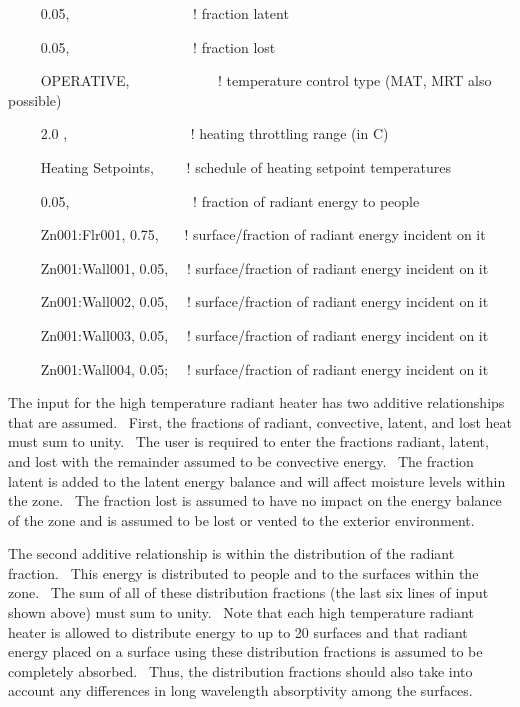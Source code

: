 {~~~~ 0.05,~~~~~~~~~~~~~~~~~ ! fraction latent

~~~~ 0.05,~~~~~~~~~~~~~~~~~ ! fraction lost

~~~~ OPERATIVE,~~~~~~~~~~~~ ! temperature control type (MAT, MRT also possible)

~~~~ 2.0 ,~~~~~~~~~~~~~~~~~ ! heating throttling range (in C)

~~~~ Heating Setpoints,~~~~ ! schedule of heating setpoint temperatures

~~~~ 0.05,~~~~~~~~~~~~~~~~~ ! fraction of radiant energy to people

~~~~ Zn001:Flr001, 0.75,~~~ ! surface/fraction of radiant energy incident on it

~~~~ Zn001:Wall001, 0.05,~~ ! surface/fraction of radiant energy incident on it

~~~~ Zn001:Wall002, 0.05,~~ ! surface/fraction of radiant energy incident on it

~~~~ Zn001:Wall003, 0.05,~~ ! surface/fraction of radiant energy incident on it

~~~~ Zn001:Wall004, 0.05;~~ ! surface/fraction of radiant energy incident on it

The input for the high temperature radiant heater has two additive relationships that are assumed.~ First, the fractions of radiant, convective, latent, and lost heat must sum to unity.~ The user is required to enter the fractions radiant, latent, and lost with the remainder assumed to be convective energy.~ The fraction latent is added to the latent energy balance and will affect moisture levels within the zone.~ The fraction lost is assumed to have no impact on the energy balance of the zone and is assumed to be lost or vented to the exterior environment.

The second additive relationship is within the distribution of the radiant fraction.~ This energy is distributed to people and to the surfaces within the zone.~ The sum of all of these distribution fractions (the last six lines of input shown above) must sum to unity.~ Note that each high temperature radiant heater is allowed to distribute energy to up to 20 surfaces and that radiant energy placed on a surface using these distribution fractions is assumed to be completely absorbed.~ Thus, the distribution fractions should also take into account any differences in long wavelength absorptivity among the surfaces.

}
